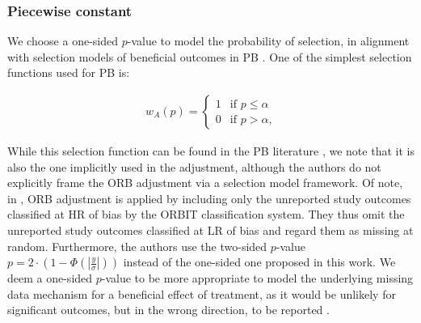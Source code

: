 \documentclass[twocolumn]{article}\usepackage[]{graphicx}\usepackage[]{xcolor}
\newcommand{\abs}[1]{\left\lvert#1\right\rvert} %
\begin{document}
\subsubsection{Piecewise constant}

We choose a one-sided $p$-value to model the probability of selection, in alignment with selection models of beneficial outcomes in PB \citep{HedgesVev, reviewselection, selectionCont}. One of the simplest selection functions used for PB is:


\begin{equation}
\begin{aligned}
\label{sel0}
w_A(p)= \begin{cases} 1 & \text{if } p \leq \alpha  \\
0 & \text{if } p > \alpha \text{,} \end{cases}
\end{aligned}
\end{equation}



While this selection function can be found in the PB literature \citep{selection0, selection1, reviewselection}, we note that it is also the one implicitly used in the \citet{Copas2019} adjustment, although the authors do not explicitly frame the ORB adjustment via a selection model framework. Of note, in \citet{Copas2019}, ORB adjustment is applied by including only the unreported study outcomes classified at HR of bias by the ORBIT classification system. They thus omit the unreported study outcomes classified at LR of bias and regard them as missing at random. Furthermore, the authors use the two-sided $p$-value $p = 2 \cdot (1 - \Phi(\abs{\frac{y}{\sigma}}))$ instead of the one-sided one proposed in this work. We deem a one-sided $p$-value to be more appropriate to model the underlying missing data mechanism for a beneficial effect of treatment, as it would be unlikely for significant outcomes, but in the wrong direction, to be reported \citep{HedgesVev, reviewselection, selectionCont}. 

\end{document}
